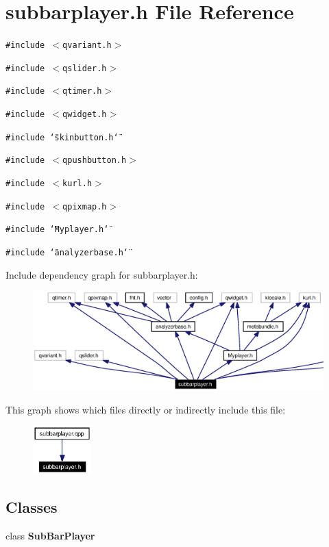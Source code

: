\section{subbarplayer.h File Reference}
\label{subbarplayer_8h}


{\tt \#include $<$qvariant.h$>$}\par
{\tt \#include $<$qslider.h$>$}\par
{\tt \#include $<$qtimer.h$>$}\par
{\tt \#include $<$qwidget.h$>$}\par
{\tt \#include \char`\"{}skinbutton.h\char`\"{}}\par
{\tt \#include $<$qpushbutton.h$>$}\par
{\tt \#include $<$kurl.h$>$}\par
{\tt \#include $<$qpixmap.h$>$}\par
{\tt \#include \char`\"{}Myplayer.h\char`\"{}}\par
{\tt \#include \char`\"{}analyzerbase.h\char`\"{}}\par


Include dependency graph for subbarplayer.h:\begin{figure}[H]
\begin{center}
\leavevmode
\includegraphics[width=389pt]{subbarplayer_8h__incl}
\end{center}
\end{figure}


This graph shows which files directly or indirectly include this file:\begin{figure}[H]
\begin{center}
\leavevmode
\includegraphics[width=64pt]{subbarplayer_8h__dep__incl}
\end{center}
\end{figure}
\subsection*{Classes}
\begin{CompactItemize}
\item 
class {\bf Sub\-Bar\-Player}
\end{CompactItemize}
